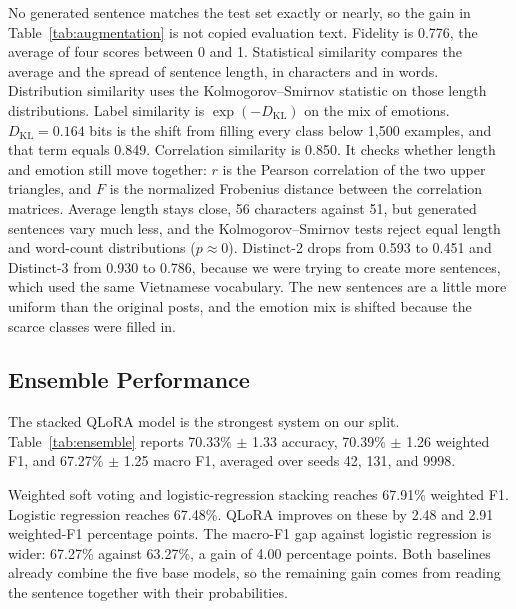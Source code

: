 \documentclass[conference]{IEEEtran}
\begin{document}
No generated sentence matches the test set exactly or nearly, so the gain in Table~\ref{tab:augmentation} is not copied evaluation text. Fidelity is 0.776, the average of four scores between 0 and 1. Statistical similarity compares the average and the spread of sentence length, in characters and in words. Distribution similarity uses the Kolmogorov--Smirnov statistic on those length distributions. Label similarity is \(\exp(-D_{\mathrm{KL}})\) on the mix of emotions. \(D_{\mathrm{KL}} = 0.164\) bits is the shift from filling every class below 1,500 examples, and that term equals 0.849. Correlation similarity is 0.850. It checks whether length and emotion still move together: \(r\) is the Pearson correlation of the two upper triangles, and \(F\) is the normalized Frobenius distance between the correlation matrices. Average length stays close, 56 characters against 51, but generated sentences vary much less, and the Kolmogorov--Smirnov tests reject equal length and word-count distributions (\(p \approx 0\)). Distinct-2 drops from 0.593 to 0.451 and Distinct-3 from 0.930 to 0.786, because we were trying to create more sentences, which used the same Vietnamese vocabulary. The new sentences are a little more uniform than the original posts, and the emotion mix is shifted because the scarce classes were filled in.

\subsection{Ensemble Performance}
The stacked QLoRA model is the strongest system on our split.
Table~\ref{tab:ensemble} reports 70.33\% $\pm$ 1.33 accuracy, 70.39\% $\pm$ 1.26 weighted F1, and 67.27\% $\pm$ 1.25 macro F1, averaged over seeds 42, 131, and 9998.

Weighted soft voting and logistic-regression stacking reaches 67.91\% weighted F1.
Logistic regression reaches 67.48\%. QLoRA improves on these by 2.48 and 2.91 weighted-F1 percentage points. The macro-F1 gap against logistic regression is wider: 67.27\% against 63.27\%, a gain of 4.00 percentage points.
Both baselines already combine the five base models, so the remaining gain comes from reading the sentence together with their probabilities.
\end{document}
